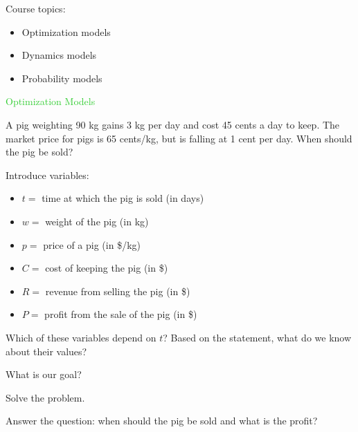 \documentclass{workbook}
\begin{document}
\begin{slide}

Course topics:

\begin{itemize}
	\item Optimization models
	\item Dynamics models
	\item Probability models
\end{itemize}
	
\end{slide}




%
%
%
%




\begin{slide}

\begin{slidesonly}
	\vspace{3cm}
\end{slidesonly}

\begin{center}
\Huge 
\textcolor{LimeGreen}{Optimization Models}
\end{center}

	
\end{slide}




\begin{slide}

\question

\begin{problem}
A pig weighting 90 kg gains 3 kg per day and cost 45 cents a day to keep. The market price for pigs is 65 cents/kg, but is falling at 1 cent per day. When should the pig be sold?	
\end{problem}

Introduce variables:
\begin{itemize}
	\item $t=$ time at which the pig is sold (in days)
	\item $w=$ weight of the pig (in kg)
	\item $p=$ price of a pig (in \$/kg)
	\item $C=$ cost of keeping the pig (in \$)
	\item $R=$ revenue from selling the pig (in \$)
	\item $P=$ profit from the sale of the pig (in \$)
\end{itemize}
	

\begin{parts}
	\item Which of these variables depend on $t$? Based on the statement, what do we know about their values?
	\item What is our goal?
	\item Solve the problem.
	\item Answer the question: when should the pig be sold and what is the profit?
\end{parts}

\end{slide}
\end{document}

